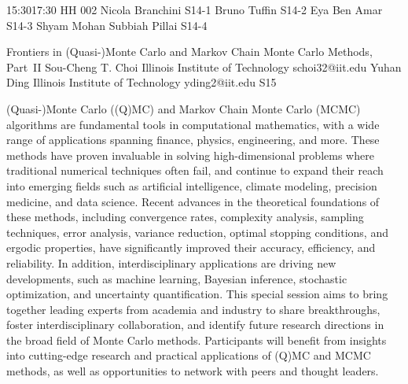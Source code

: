 \documentclass[12pt,lettersize,oneside]{book} %
\begin{document}
\sessionPart{}%
{\hfill{}
{15:30}{17:30} %
{HH 002}} %
{Nicola Branchini}
{S14-1}
{Bruno Tuffin}
{S14-2}
{Eya Ben Amar}
{S14-3}
{Shyam Mohan Subbiah Pillai}
{S14-4}



\clearpage

\begin{session}
 {Frontiers in (Quasi-)Monte Carlo and Markov Chain Monte Carlo Methods, Part~II}%
 {Sou-Cheng T. Choi}%
 {Illinois Institute of Technology}%
 {schoi32@iit.edu}%
 {Yuhan Ding}%
 {Illinois Institute of Technology}%
 {yding2@iit.edu}%
 {S15}%
{}

 (Quasi-)Monte Carlo ((Q)MC) and Markov Chain Monte Carlo (MCMC) algorithms are fundamental tools in computational mathematics, with a wide range of applications spanning finance, physics, engineering, and more. These methods have proven invaluable in solving high-dimensional problems where traditional numerical techniques often fail, and continue to expand their reach into emerging fields such as artificial intelligence, climate modeling, precision medicine, and data science.
 Recent advances in the theoretical foundations of these methods, including convergence rates, complexity analysis, sampling techniques, error analysis, variance reduction, optimal stopping conditions, and ergodic properties, have significantly improved their accuracy, efficiency, and reliability. In addition, interdisciplinary applications are driving new developments, such as machine learning, Bayesian inference, stochastic optimization, and uncertainty quantification.
 This special session aims to bring together leading experts from academia and industry to share breakthroughs, foster interdisciplinary collaboration, and identify future research directions in the broad field of Monte Carlo methods. Participants will benefit from insights into cutting-edge research and practical applications of (Q)MC and MCMC methods, as well as opportunities to network with peers and thought leaders.
\end{session}
\end{document}
